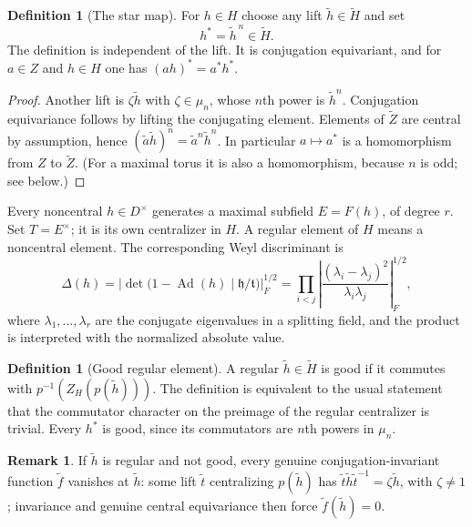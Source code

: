 \documentclass[11pt]{article}
\newcommand{\tH}{\widetilde H}
\newcommand{\tZ}{\widetilde Z}
\theoremstyle{plain}
\theoremstyle{definition}
\newtheorem{definition}[theorem]{Definition}
\newtheorem{remark}[theorem]{Remark}
\begin{document}
\begin{definition}[The star map]\label{def:star}
For $h\in H$ choose any lift $\widetilde h\in\tH$ and set
\begin{equation}\label{eq:star}
h^*=\widetilde h^{\,n}\in\tH.
\end{equation}
The definition is independent of the lift. It is conjugation equivariant, and for $a\in Z$ and $h\in H$ one has $(ah)^*=a^*h^*$.
\end{definition}
\begin{proof}
Another lift is $\zeta\widetilde h$ with $\zeta\in\mu_n$, whose $n$th power is $\widetilde h^n$. Conjugation equivariance follows by lifting the conjugating element. Elements of $\tZ$ are central by assumption, hence $(\widetilde a\widetilde h)^n=\widetilde a^n\widetilde h^n$. In particular $a\mapsto a^*$ is a homomorphism from $Z$ to $\tZ$. (For a maximal torus it is also a homomorphism, because $n$ is odd; see below.)
\end{proof}

Every noncentral $h\in D^\times$ generates a maximal subfield $E=F(h)$, of degree $r$. Set $T=E^\times$; it is its own centralizer in $H$. A regular element of $H$ means a noncentral element. The corresponding Weyl discriminant is
\begin{equation}\label{eq:disc}
\Delta(h)=\left|\det\bigl(1-\operatorname{Ad}(h)\mid \mathfrak h/\mathfrak t\bigr)\right|_F^{1/2}
=\prod_{i<j}\left|\frac{(\lambda_i-\lambda_j)^2}{\lambda_i\lambda_j}\right|_F^{1/2},
\end{equation}
where $\lambda_1,\dots,\lambda_r$ are the conjugate eigenvalues in a splitting field, and the product is interpreted with the normalized absolute value.

\begin{definition}[Good regular element]\label{def:good}
A regular $\widetilde h\in\tH$ is good if it commutes with $p^{-1}(Z_H(p(\widetilde h)))$. The definition is equivalent to the usual statement that the commutator character on the preimage of the regular centralizer is trivial. Every $h^*$ is good, since its commutators are $n$th powers in $\mu_n$.
\end{definition}

\begin{remark}\label{rem:good-vanish}
If $\widetilde h$ is regular and not good, every genuine conjugation-invariant function $\widetilde f$ vanishes at $\widetilde h$: some lift $\widetilde t$ centralizing $p(\widetilde h)$ has $\widetilde t\widetilde h\widetilde t^{-1}=\zeta\widetilde h$, with $\zeta\neq1$; invariance and genuine central equivariance then force $\widetilde f(\widetilde h)=0$.
\end{remark}
\end{document}
